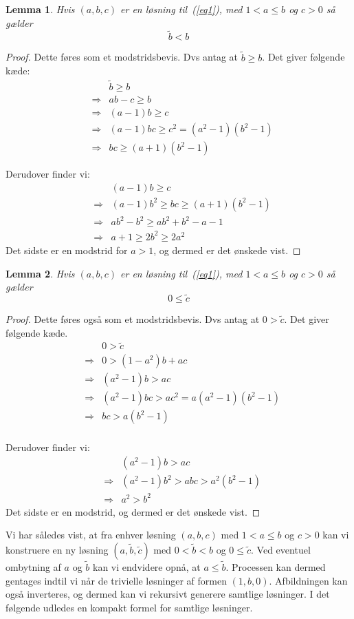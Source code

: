 \documentclass[12pt,oneside,a4paper]{article}
\newcommand{\bas}{\begin{eqnarray*}}
\newcommand{\eas}{\end{eqnarray*}}
\newtheorem{lem}{Lemma}[section]
\begin{document}
\begin{lem}
    Hvis $(a,b,c)$ er en løsning til~(\ref{eq1}), med $1<a\le b$ og $c>0$
    så gælder
    $$
    \tilde b < b
    $$
\end{lem}
\begin{proof}
    Dette føres som et modstridsbevis. Dvs antag at $\tilde b \ge b$. Det giver
    følgende kæde:
    \bas
    && \tilde b \ge b \\
    &\Rightarrow& ab-c \ge b \\
    &\Rightarrow& (a-1)b \ge c \\
    &\Rightarrow& (a-1)bc \ge c^2 = (a^2-1)(b^2-1) \\
    &\Rightarrow& bc \ge (a+1)(b^2-1)
    \eas
    
    Derudover finder vi:
    \bas
    && (a-1)b \ge c \\
    &\Rightarrow& (a-1)b^2 \ge bc \ge (a+1)(b^2-1) \\
    &\Rightarrow& ab^2-b^2 \ge ab^2+b^2-a-1 \\
    &\Rightarrow& a+1 \ge 2b^2 \ge 2a^2
    \eas
    Det sidste er en modstrid for $a>1$, og dermed er det ønskede vist.
\end{proof}

\begin{lem}
    Hvis $(a,b,c)$ er en løsning til~(\ref{eq1}), med $1<a\le b$ og $c>0$
    så gælder
    $$
    0 \le \tilde c
    $$
\end{lem}
\begin{proof}
    Dette føres også som et modstridsbevis. Dvs antag at $0 > \tilde c$. Det
    giver følgende kæde.
    \bas
    &&0 > \tilde c\\
    &\Rightarrow& 0 > (1-a^2)b+ac \\
    &\Rightarrow& (a^2-1)b > ac \\
    &\Rightarrow& (a^2-1)bc > ac^2 = a(a^2-1)(b^2-1) \\
    &\Rightarrow& bc > a(b^2-1) \\
    \eas
    
    Derudover finder vi:
    \bas
    && (a^2-1)b > ac \\
    &\Rightarrow& (a^2-1)b^2 > abc > a^2(b^2-1) \\
    &\Rightarrow& a^2 > b^2
    \eas
    Det sidste er en modstrid, og dermed er det ønskede vist.
\end{proof}

Vi har således vist, at fra enhver løsning $(a,b,c)$ med $1<a\le b$ og $c>0$
kan vi konstruere en ny løsning $(a, \tilde b, \tilde c)$ med $0<\tilde b < b$
og $0 \le \tilde c$. Ved eventuel ombytning af $a$ og $\tilde b$ kan vi
endvidere opnå, at $a\le\tilde b$. Processen kan dermed gentages indtil vi når
de trivielle løsninger af formen $(1, b, 0)$.
Afbildningen kan også inverteres, og dermed kan vi rekursivt generere samtlige
løsninger. I det følgende udledes en kompakt formel for samtlige løsninger.
\end{document}
